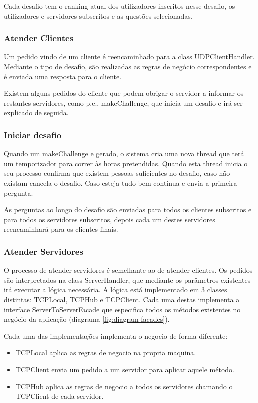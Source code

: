 \documentclass[runningheads,a4paper]{llncs}
\begin{document}
Cada desafio tem o ranking atual dos utilizadores inscritos nesse desafio, os utilizadores e servidores subscritos e as questões selecionadas.

\subsubsection{Atender Clientes}

Um pedido vindo de um cliente é reencaminhado para a class UDPClientHandler. Mediante o tipo de desafio, são realizadas as regras de negócio correspondentes e é enviada uma resposta para o cliente.

Existem alguns pedidos do cliente que podem obrigar o servidor a informar os restantes servidores, como p.e., makeChallenge, que inicia um desafio e irá ser explicado de seguida.

\subsubsection{Iniciar desafio}

Quando um makeChallenge e gerado, o sistema cria uma nova thread que terá um temporizador para correr às horas pretendidas. Quando esta thread inicia o seu processo confirma que existem pessoas suficientes no desafio, caso não existam cancela o desafio. Caso esteja tudo bem continua e envia a primeira pergunta.

As perguntas ao longo do desafio são enviadas para todos os clientes subscritos e para todos os servidores subscritos, depois cada um destes servidores reencaminhará para os clientes finais.

\subsubsection{Atender Servidores}

O processo de atender servidores é semelhante ao de atender clientes. Os pedidos são interpretados na class ServerHandler, que mediante os parâmetros existentes irá executar a lógica necessária.
A lógica está implementado em 3 classes distintas: TCPLocal, TCPHub e TCPClient. Cada uma destas implementa a interface ServerToServerFacade que especifica todos os métodos existentes no negócio da aplicação (diagrama \ref{fig:diagram-facades}).

Cada uma das implementações implementa o negocio de forma diferente:
\begin{itemize}
\item TCPLocal aplica as regras de negocio na propria maquina.
\item TCPClient envia um pedido a um servidor para aplicar aquele método.
\item TCPHub aplica as regras de negocio a todos os servidores chamando o TCPClient de cada servidor.
\end{itemize}
\end{document}
